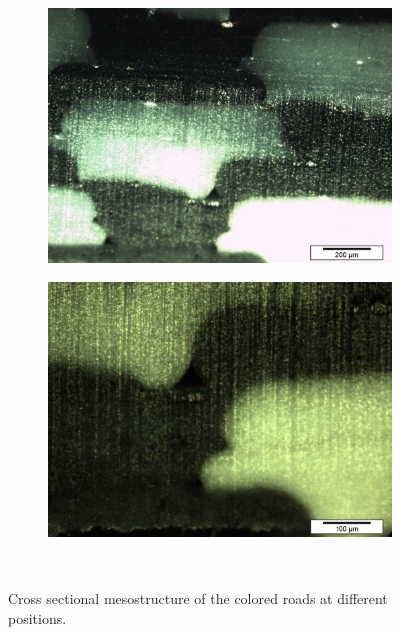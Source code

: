 \begin{figure}[htb]
\begin{subfigure}[b]{0.48\textwidth}
    \caption{}
    \label{fig:coloredroads_b}
  \end{subfigure}
  \\
    \begin{subfigure}[b]{0.48\textwidth}
    \includegraphics[width=\textwidth]{chapter_4_RVE_Definition/figures/colored/Tv42_LI.jpg}
    \caption{}
    \label{fig:coloredroads_c}
  \end{subfigure}
  \begin{subfigure}[b]{0.48\textwidth}
    \includegraphics[width=\textwidth]{chapter_4_RVE_Definition/figures/colored/Tv86a_LI.jpg}
    \caption{}
    \label{fig:coloredroads_d}
  \end{subfigure}
  \\
  
  \caption{Cross sectional mesostructure of the colored roads at different positions. }
    \label{fig:coloredroads}
\end{figure}

